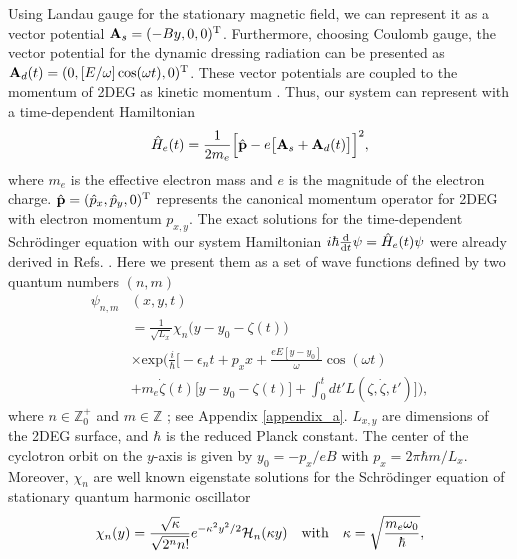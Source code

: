 Using Landau gauge for the stationary magnetic field, we can represent it as a vector potential $\vb{A}_{s} = (-By,0,0)^{\text{T}}$. Furthermore, choosing Coulomb gauge, the vector potential for the dynamic dressing radiation can be presented as $\vb{A}_{d}(t) = (0,[E/\omega ]\cos(\omega t),0)^{\text{T}}$. These vector potentials are coupled to the momentum of 2DEG as kinetic momentum \cite{mahan00,bruus04}. Thus, our system can represent with a time-dependent Hamiltonian
\begin{equation} \label{eq_1}
  \hat{H}_e(t) = \frac{1}{2m_e}\Big[\hat{\vb{p}} - e\big[\vb{A}_{s}+\vb{A}_{d}(t)\big]\Big]^2,
\end{equation}
where $m_e$ is the effective electron mass and $e$ is the magnitude of the electron charge. $\hat{\vb{p}} = (\hat{p}_x,\hat{p}_y,0)^{\text{T}}$ represents the canonical momentum operator for 2DEG with electron momentum $p_{x,y}$.
The exact solutions for the time-dependent Schrödinger equation with our system Hamiltonian $i\hbar \dv{t}\psi = \hat{H}_e(t) \psi$ were already derived in Refs. \cite{husimi53,ditt98,dini16}. Here we present them as a set of wave functions defined by two quantum numbers $(n,m)$
\begin{equation} \label{eq_2}
  \begin{aligned}
    \psi_{n,m}&(x,y,t)  \\
    & = \frac{1}{\sqrt{L_x}}
    \chi_n\big(y - y_0 - \zeta(t)\big)\\
    & \times
    \text{exp}\bigg(
    \frac{i}{\hbar}\bigg[- \epsilon_n t
    + p_x x + \frac{eE[y - y_0]}{\omega}\cos(\omega t)\\
    &+
    m_e\dot{\zeta}(t)\big[y - y_0 -\zeta(t)\big] +
    \int_0^{t}dt'L(\zeta,\dot{\zeta},t')\bigg]\bigg),
  \end{aligned}
\end{equation}
where $n \in \mathbb{Z}^{+}_0$ and $m \in \mathbb{Z}$ ; see Appendix \ref{appendix_a}. $L_{x,y}$ are dimensions of the 2DEG surface, and $\hbar$ is the reduced Planck constant. The center of the cyclotron orbit on the $y$-axis is given by $y_0 = -p_x/eB$ with $p_x = 2\pi \hbar m/L_x$. Moreover, $\chi_n$ are well known eigenstate solutions for the Schrödinger equation of stationary quantum harmonic oscillator
\begin{equation} \label{eq_3}
  \chi_n(y) =
   \frac{\sqrt{\kappa}}{\sqrt{2^{n}n!}}
  e^{-\kappa^2 y^2/2}
  \mathcal{H}_n \qty(\kappa y) \quad \text{with}
  \quad
  \kappa = \sqrt{\frac{m_e \omega_0}{\hbar}},
\end{equation}
